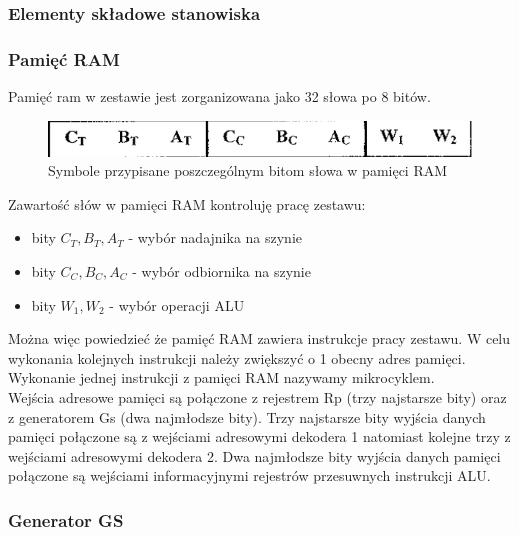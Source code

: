 \documentclass[../main.tex]{subfiles}
\begin{document}
    \subsubsection{Elementy składowe stanowiska}

        \subsubsection*{Pamięć RAM}

        Pamięć ram w zestawie jest zorganizowana jako 32 słowa po 8 bitów.
        
        \begin{figure}[H]
            \centering
            \includegraphics[width=\linewidth]{ram_symbol.png}
            \caption{Symbole przypisane  poszczególnym bitom słowa w pamięci RAM}
            \label{fig:ram_symbol}
        \end{figure}
        
        Zawartość słów w pamięci RAM kontroluję pracę zestawu:

        \begin{itemize}
            \item bity $C_T, B_T, A_T$ - wybór nadajnika na szynie
            \item bity $C_C, B_C, A_C$ - wybór odbiornika na szynie
            \item bity $W_1, W_2$ - wybór operacji ALU
        \end{itemize}

        Można więc powiedzieć że pamięć RAM zawiera instrukcje pracy zestawu. W celu wykonania kolejnych instrukcji należy zwiększyć o 1
        obecny adres pamięci. Wykonanie jednej instrukcji z pamięci RAM nazywamy mikrocyklem.
        \\
        Wejścia adresowe pamięci są połączone z rejestrem Rp (trzy najstarsze bity) oraz z generatorem Gs (dwa najmłodsze bity). 
        Trzy najstarsze bity wyjścia danych pamięci połączone są z wejściami adresowymi dekodera 1 natomiast kolejne trzy z wejściami 
        adresowymi dekodera 2. Dwa najmłodsze bity wyjścia danych pamięci połączone są wejściami informacyjnymi rejestrów przesuwnych instrukcji ALU.

        \subsubsection*{Generator GS}
        
\end{document}
